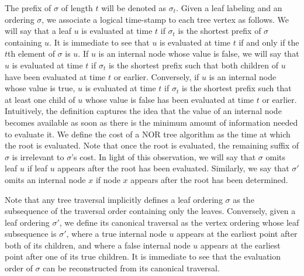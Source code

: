 The prefix of $\sigma$ of length $t$ will be denoted as $\sigma_t$.
Given a leaf labeling and an ordering $\sigma$, 
we associate a logical time-stamp to each tree vertex as follows.
We will say that a leaf $u$ is evaluated at time $t$ 
if $\sigma_t$ is the shortest prefix of $\sigma$ containing $u$.
It is immediate to see that $u$ is evaluated at time $t$ if and only if
the $t$th element of $\sigma$ is $u$.
If $u$ is an internal node whose value is false,
we will say that $u$ is evaluated at time $t$ if 
$\sigma_t$ is the shortest prefix such that both children of $u$
have been evaluated at time $t$ or earlier. 
Conversely, if $u$ is an internal node whose value is true,
$u$ is evaluated at time $t$ if 
$\sigma_t$ is the shortest prefix such that at least one
child of $u$ whose value is false 
has been evaluated at time $t$ or earlier.
Intuitively, the definition captures the idea that the value of an 
internal node becomes available as soon as there is the minimum
amount of information needed to evaluate it. 
We define the  cost of a NOR tree algorithm
as the time at which the root is evaluated.
Note that once the root is evaluated, 
the remaining suffix of $\sigma$ is irrelevant to 
$\sigma$'s cost. 
In light of this observation, we will say that 
$\sigma$ omits leaf $u$ if leaf $u$ appears after
the root has been evaluated.
Similarly, we say that $\sigma'$ omits an internal node $x$ 
if node $x$ appears after the root has been determined.

Note that any tree traversal implicitly defines a 
leaf ordering $\sigma$ as the subsequence of the traversal order
containing only the leaves. 
Conversely, given a leaf ordering $\sigma'$, we define its 
canonical traversal as the vertex ordering whose leaf 
subsequence is $\sigma'$,
where a true internal node $u$ appears at the earliest point after
both of its children, and
where a false internal node $u$ appears at the earliest point after
one of its true children.
It is immediate to see that the evaluation order of $\sigma$ can be 
reconstructed from its canonical traversal. 

